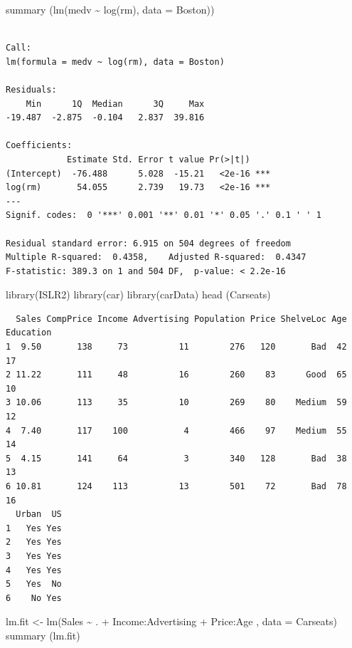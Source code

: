 \documentclass[
  letterpaper,
  DIV=11,
  numbers=noendperiod]{scrartcl}
\newenvironment{Shaded}{\begin{snugshade}}{\end{snugshade}}
\newcommand{\AttributeTok}[1]{\textcolor[rgb]{0.40,0.45,0.13}{#1}}
\newcommand{\FunctionTok}[1]{\textcolor[rgb]{0.28,0.35,0.67}{#1}}
\newcommand{\NormalTok}[1]{\textcolor[rgb]{0.00,0.23,0.31}{#1}}
\newcommand{\OtherTok}[1]{\textcolor[rgb]{0.00,0.23,0.31}{#1}}
\newcommand{\SpecialCharTok}[1]{\textcolor[rgb]{0.37,0.37,0.37}{#1}}
\begin{document}
\begin{Shaded}
\begin{Highlighting}[]
\FunctionTok{summary}\NormalTok{ (}\FunctionTok{lm}\NormalTok{(medv }\SpecialCharTok{\textasciitilde{}} \FunctionTok{log}\NormalTok{(rm), }\AttributeTok{data =}\NormalTok{ Boston))}
\end{Highlighting}
\end{Shaded}

\begin{verbatim}

Call:
lm(formula = medv ~ log(rm), data = Boston)

Residuals:
    Min      1Q  Median      3Q     Max 
-19.487  -2.875  -0.104   2.837  39.816 

Coefficients:
            Estimate Std. Error t value Pr(>|t|)    
(Intercept)  -76.488      5.028  -15.21   <2e-16 ***
log(rm)       54.055      2.739   19.73   <2e-16 ***
---
Signif. codes:  0 '***' 0.001 '**' 0.01 '*' 0.05 '.' 0.1 ' ' 1

Residual standard error: 6.915 on 504 degrees of freedom
Multiple R-squared:  0.4358,    Adjusted R-squared:  0.4347 
F-statistic: 389.3 on 1 and 504 DF,  p-value: < 2.2e-16
\end{verbatim}

\begin{Shaded}
\begin{Highlighting}[]
\FunctionTok{library}\NormalTok{(ISLR2)}
\FunctionTok{library}\NormalTok{(car)}
\FunctionTok{library}\NormalTok{(carData)}
\FunctionTok{head}\NormalTok{ (Carseats)}
\end{Highlighting}
\end{Shaded}

\begin{verbatim}
  Sales CompPrice Income Advertising Population Price ShelveLoc Age Education
1  9.50       138     73          11        276   120       Bad  42        17
2 11.22       111     48          16        260    83      Good  65        10
3 10.06       113     35          10        269    80    Medium  59        12
4  7.40       117    100           4        466    97    Medium  55        14
5  4.15       141     64           3        340   128       Bad  38        13
6 10.81       124    113          13        501    72       Bad  78        16
  Urban  US
1   Yes Yes
2   Yes Yes
3   Yes Yes
4   Yes Yes
5   Yes  No
6    No Yes
\end{verbatim}

\begin{Shaded}
\begin{Highlighting}[]
\NormalTok{lm.fit }\OtherTok{\textless{}{-}} \FunctionTok{lm}\NormalTok{(Sales }\SpecialCharTok{\textasciitilde{}}\NormalTok{ . }\SpecialCharTok{+}\NormalTok{ Income}\SpecialCharTok{:}\NormalTok{Advertising }\SpecialCharTok{+}\NormalTok{ Price}\SpecialCharTok{:}\NormalTok{Age ,}
\AttributeTok{data =}\NormalTok{ Carseats)}
\FunctionTok{summary}\NormalTok{ (lm.fit)}
\end{Highlighting}
\end{Shaded}
\end{document}
